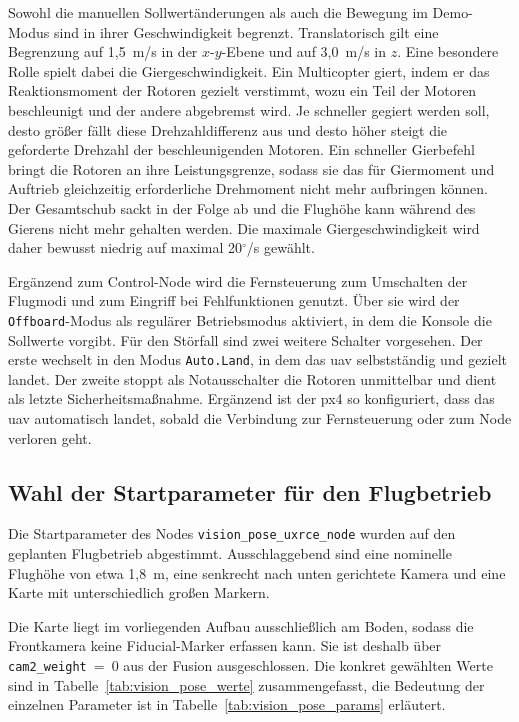 Sowohl die manuellen Sollwertänderungen als auch die Bewegung im Demo-Modus sind in ihrer Geschwindigkeit begrenzt.
Translatorisch gilt eine Begrenzung auf 1,5~m/s in der $x$-$y$-Ebene und auf 3,0~m/s in $z$.
Eine besondere Rolle spielt dabei die Giergeschwindigkeit.
Ein Multicopter giert, indem er das Reaktionsmoment der Rotoren gezielt verstimmt, wozu ein Teil der Motoren beschleunigt und der andere abgebremst wird.
Je schneller gegiert werden soll, desto größer fällt diese Drehzahldifferenz aus und desto höher steigt die geforderte Drehzahl der beschleunigenden Motoren.
Ein schneller Gierbefehl bringt die Rotoren an ihre Leistungsgrenze, sodass sie das für Giermoment und Auftrieb gleichzeitig erforderliche Drehmoment nicht mehr aufbringen können.
Der Gesamtschub sackt in der Folge ab und die Flughöhe kann während des Gierens nicht mehr gehalten werden.
Die maximale Giergeschwindigkeit wird daher bewusst niedrig auf maximal 20$^\circ$/s gewählt.

Ergänzend zum Control-Node wird die Fernsteuerung zum Umschalten der Flugmodi und zum Eingriff bei Fehlfunktionen genutzt.
Über sie wird der \texttt{Offboard}-Modus als regulärer Betriebsmodus aktiviert, in dem die Konsole die Sollwerte vorgibt.
Für den Störfall sind zwei weitere Schalter vorgesehen.
Der erste wechselt in den Modus \texttt{Auto.Land}, in dem das \gls{uav} selbstständig und gezielt landet.
Der zweite stoppt als Notausschalter die Rotoren unmittelbar und dient als letzte Sicherheitsmaßnahme. 
Ergänzend ist der \gls{px4} so konfiguriert, dass das \gls{uav} automatisch landet, sobald die Verbindung zur Fernsteuerung oder zum Node verloren geht.

\subsection{Wahl der Startparameter für den Flugbetrieb}
\label{subsec:pos_parametrierung}
Die Startparameter des Nodes \texttt{vision\_pose\_uxrce\_node} wurden auf den geplanten Flugbetrieb abgestimmt.
Ausschlaggebend sind eine nominelle Flughöhe von etwa 1,8~m, eine senkrecht nach unten gerichtete Kamera und eine Karte mit unterschiedlich großen Markern.

Die Karte liegt im vorliegenden Aufbau ausschließlich am Boden, sodass die Frontkamera keine Fiducial-Marker erfassen kann.
Sie ist deshalb über \texttt{cam2\_weight}~=~0 aus der Fusion ausgeschlossen.
Die konkret gewählten Werte sind in Tabelle~\ref{tab:vision_pose_werte} zusammengefasst, die Bedeutung der einzelnen Parameter ist in Tabelle~\ref{tab:vision_pose_params} erläutert.

